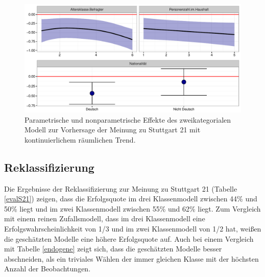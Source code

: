 \documentclass{Vorlage}
\begin{document}
\begin{figure}[h]
 \begin{center}
 \includegraphics[scale=0.8]{Pictures/BWModelEffects}
 \caption{Parametrische und nonparametrische Effekte des zweikategorialen Modell zur Vorhersage der Meinung zu Stuttgart 21 mit kontinuierlichem räumlichen Trend.}
 \label{BWParam}
 \end{center}
\end{figure}

\subsection{Reklassifizierung}

Die Ergebnisse der Reklassifizierung zur Meinung zu Stuttgart 21 (Tabelle \ref{evalS21}) zeigen, dass die Erfolgsquote im drei Klassenmodell zwischen 44\% und 50\% liegt und im zwei Klassenmodell zwischen 55\% und 62\% liegt. Zum Vergleich mit einem reinen Zufallsmodell, dass im drei Klassenmodell eine Erfolgswahrscheinlichkeit von 1/3 und im zwei Klassenmodell von 1/2 hat, weißen die geschätzten Modelle eine höhere Erfolgsquote auf. Auch bei einem Vergleich mit Tabelle \ref{endogene} zeigt sich, dass die geschätzten Modelle besser abschneiden, als ein triviales Wählen der immer gleichen Klasse mit der höchsten Anzahl der Beobachtungen.
\end{document}
